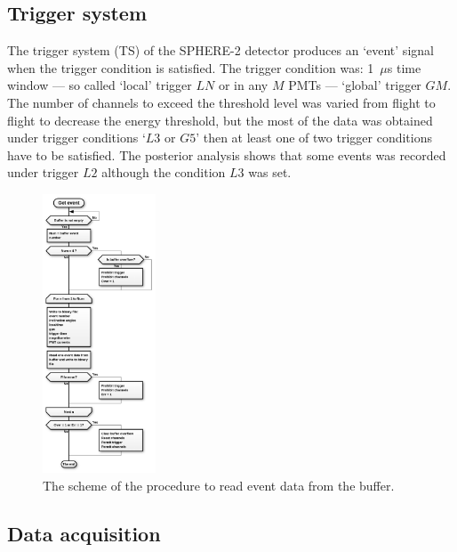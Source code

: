 \documentclass[final,5p,times,twocolumn]{elsarticle}
\begin{document}
\subsection{Trigger system}
The trigger system (TS) of the SPHERE-2 detector produces an `event' signal when the trigger condition is satisfied. The trigger condition was: 1~${\mu}$s time window --- so called `local' trigger $LN$ or in any $M$ PMTs --- `global' trigger $GM$. The number of channels to exceed the threshold level was varied from flight to flight to decrease the energy threshold, but the most of the data was obtained under trigger conditions `$L3$ or $G5$' then at least one of two trigger conditions have to be satisfied. The posterior analysis shows that some events was recorded under trigger $L2$ although the condition $L3$ was set.


\begin{figure}[t]
\centering
\includegraphics[width=0.3\textwidth]{figs/get_event_algorithm.png}\hspace{2pc}%
\caption{The scheme of the procedure to read event data from the buffer.}
\label{fig:get_event_algorithm}
\end{figure}


\subsection{Data acquisition} 
\end{document}
